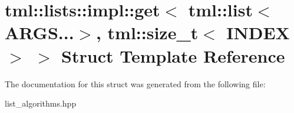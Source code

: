 \hypertarget{structtml_1_1lists_1_1impl_1_1get_3_01tml_1_1list_3_01ARGS_8_8_8_4_00_01tml_1_1size__t_3_01INDEX_01_4_01_4}{\section{tml\+:\+:lists\+:\+:impl\+:\+:get$<$ tml\+:\+:list$<$ A\+R\+G\+S...$>$, tml\+:\+:size\+\_\+t$<$ I\+N\+D\+E\+X $>$ $>$ Struct Template Reference}
\label{structtml_1_1lists_1_1impl_1_1get_3_01tml_1_1list_3_01ARGS_8_8_8_4_00_01tml_1_1size__t_3_01INDEX_01_4_01_4}
}


The documentation for this struct was generated from the following file\+:\begin{DoxyCompactItemize}
\item 
list\+\_\+algorithms.\+hpp\end{DoxyCompactItemize}
